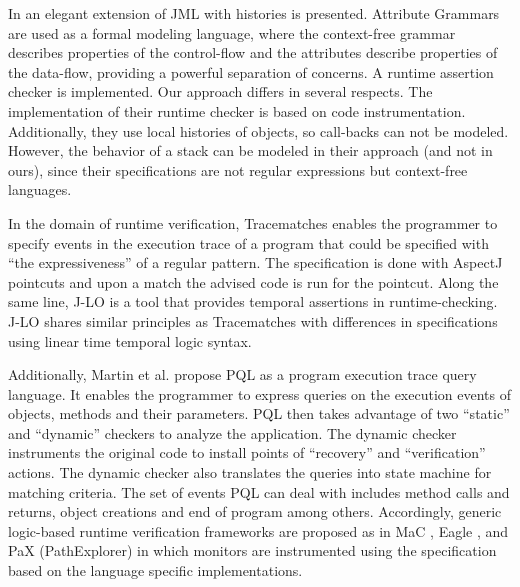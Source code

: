 In \cite{stijn} an elegant extension of JML with histories is presented.
Attribute Grammars \cite{DBLP:journals/mst/Knuth68} are used as a formal
modeling language, where the context-free grammar describes properties of the
control-flow and the attributes describe properties of the data-flow, providing
a powerful separation of concerns. A runtime assertion checker is
implemented. Our approach differs in several respects. The
implementation of their runtime checker is based on code
instrumentation. Additionally, they use local histories of objects,
so call-backs can not be modeled. However, the behavior of a stack
can be modeled in their approach (and not in ours), since their
specifications are not regular expressions but context-free languages.

In the domain of runtime verification, Tracematches \cite{tracematches} enables the
programmer to specify events in the execution trace of a program that could be specified 
with ``the expressiveness'' of a regular pattern. The specification is done with 
AspectJ pointcuts and upon a match the advised code is run for the pointcut.
Along the same line, J-LO \cite{bodden_jlo} is a tool that provides temporal assertions in
runtime-checking. J-LO shares similar principles as Tracematches with differences 
in specifications using linear time temporal logic syntax.

Additionally, Martin et al. propose PQL \cite{martin_livshits_lam_pql} as a 
program execution trace query language. It enables the programmer to express queries 
on the execution events of objects, methods and their parameters. PQL then takes 
advantage of two ``static'' and ``dynamic'' checkers to analyze the application. The 
dynamic checker instruments the original code to install points of ``recovery'' and
``verification'' actions. The dynamic checker also translates the queries into
state machine for matching criteria. The set of events PQL can deal with
includes method calls and returns, object creations and end of program among
others. Accordingly, generic logic-based runtime verification frameworks are
proposed as in MaC \cite{java_mac}, Eagle \cite{eagle}, and PaX (PathExplorer)
\cite{pax} in which monitors are instrumented using the specification based on
the language specific implementations.

